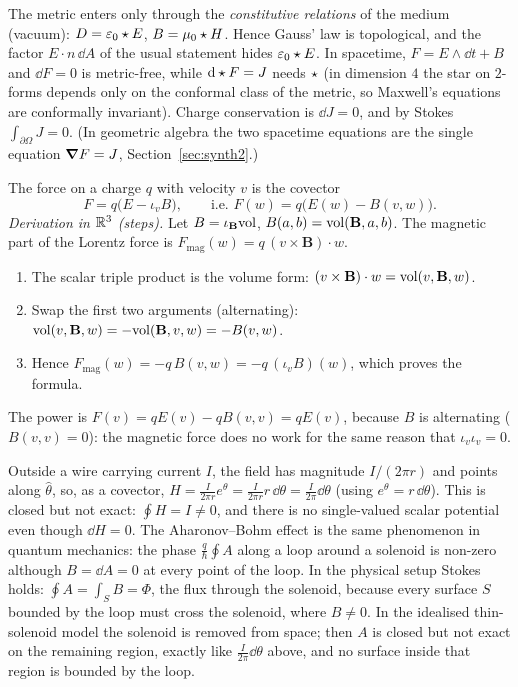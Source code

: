 The metric enters only through the \emph{constitutive relations} of the medium (vacuum): $D=\varepsilon_0\star E$, $B=\mu_0\star H$. Hence Gauss' law is topological, and the factor $E\cdot n\,\dd A$ of the usual statement hides $\varepsilon_0\star E$. In spacetime, $F=E\wedge\dd t+B$ and $\dd F=0$ is metric-free, while $\mathrm{d}\star F=J$ needs $\star$ (in dimension $4$ the star on $2$-forms depends only on the conformal class of the metric, so Maxwell's equations are conformally invariant). Charge conservation is $\dd J=0$, and by Stokes $\int_{\partial\Omega}J=0$.
(In geometric algebra the two spacetime equations are the single equation $\boldsymbol{\nabla} F=J$, Section~\ref{sec:synth2}.)

The force on a charge $q$ with velocity $v$ is the covector
\begin{equation}\label{eq:lorentz}
F=q\bigl(E-\iota_vB\bigr),\qquad\text{i.e. }F(w)=q\bigl(E(w)-B(v,w)\bigr).
\end{equation}
\emph{Derivation in $\mathbb{R}^3$ (steps).} Let $B=\iota_{\mathbf B}\mathrm{vol}$, \ie $B(a,b)=\mathrm{vol}(\mathbf B,a,b)$. The magnetic part of the Lorentz force is $F_{\mathrm{mag}}(w)=q\,(v\times\mathbf B)\cdot w$.
\begin{enumerate}
\item The scalar triple product is the volume form: $(v\times\mathbf B)\cdot w=\mathrm{vol}(v,\mathbf B,w)$.
\item Swap the first two arguments (alternating): $\mathrm{vol}(v,\mathbf B,w)=-\mathrm{vol}(\mathbf B,v,w)=-B(v,w)$.
\item Hence $F_{\mathrm{mag}}(w)=-q\,B(v,w)=-q\,(\iota_vB)(w)$, which proves the formula.
\end{enumerate}
The power is $F(v)=qE(v)-qB(v,v)=qE(v)$, because $B$ is alternating ($B(v,v)=0$): the magnetic force does no work for the same reason that $\iota_v\iota_v=0$.

\begin{example}\label{ex:ampere}
Outside a wire carrying current $I$, the field has magnitude $I/(2\pi r)$ and points along $\hat\theta$, so, as a covector, $H=\frac I{2\pi r}e^\theta=\frac I{2\pi r}r\,\dd\theta=\frac I{2\pi}\dd\theta$ (using $e^\theta=r\,\dd\theta$). This is closed but not exact: $\oint H=I\neq0$, and there is no single-valued scalar potential even though $\dd H=0$.
The Aharonov--Bohm effect \cite{AharonovBohm} is the same phenomenon in quantum mechanics: the phase $\frac q\hbar\oint A$ along a loop around a solenoid is non-zero although $B=\dd A=0$ at every point of the loop. In the physical setup Stokes holds: $\oint A=\int_SB=\Phi$, the flux through the solenoid, because every surface $S$ bounded by the loop must cross the solenoid, where $B\neq0$. In the idealised thin-solenoid model the solenoid is removed from space; then $A$ is closed but not exact on the remaining region, exactly like $\frac I{2\pi}\dd\theta$ above, and no surface inside that region is bounded by the loop.
\end{example}
